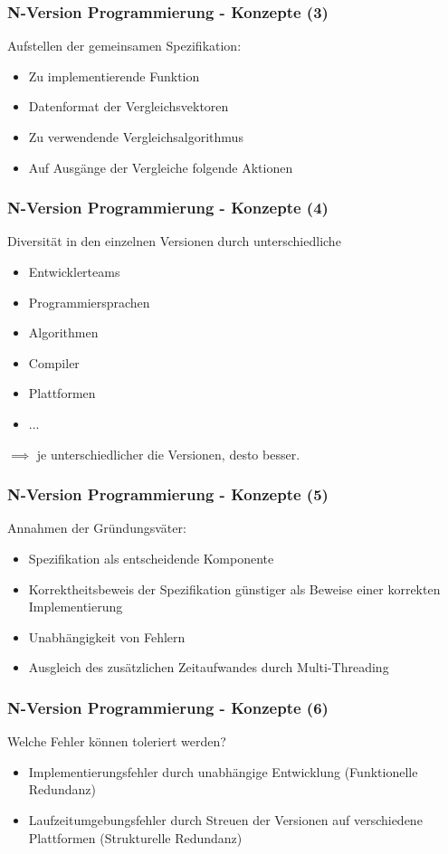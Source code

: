 %
%
\begin{frame}
	\frametitle{N-Version Programmierung - Konzepte (3)}
	Aufstellen der gemeinsamen Spezifikation:
	\begin{itemize}
		\item Zu implementierende Funktion
		\item Datenformat der Vergleichsvektoren
		\item Zu verwendende Vergleichsalgorithmus
		\item Auf Ausgänge der Vergleiche folgende Aktionen
	\end{itemize}
\end{frame}
%
%
\begin{frame}
	\frametitle{N-Version Programmierung - Konzepte (4)}
	Diversität in den einzelnen Versionen durch unterschiedliche
	\begin{itemize}
		\item Entwicklerteams
		\item Programmiersprachen
		\item Algorithmen
		\item Compiler
		\item Plattformen
		\item ...
	\end{itemize}
	$\implies$ je unterschiedlicher die Versionen, desto besser.
\end{frame}
%
%
\begin{frame}
	\frametitle{N-Version Programmierung - Konzepte (5)}
	Annahmen der Gründungsväter:
	\begin{itemize}		
		\item Spezifikation als entscheidende Komponente		
		\item Korrektheitsbeweis der Spezifikation günstiger als Beweise einer korrekten Implementierung
		\item Unabhängigkeit von Fehlern
		\item Ausgleich des zusätzlichen Zeitaufwandes durch Multi-Threading
	\end{itemize}
\end{frame}
%
%
\begin{frame}
	\frametitle{N-Version Programmierung - Konzepte (6)}
	Welche Fehler können toleriert werden?
	\begin{itemize}		
		\item Implementierungsfehler durch unabhängige Entwicklung (Funktionelle Redundanz)
		\item Laufzeitumgebungsfehler durch Streuen der Versionen auf verschiedene Plattformen (Strukturelle Redundanz)
	\end{itemize}
\end{frame}
%
%
